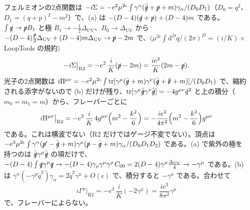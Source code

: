 \documentclass[a4paper,10pt]{ltjsarticle}
\newcommand{\dd}{\mathrm{d}}
\newcommand{\DUV}{\Delta_{\mathrm{UV}}}
\begin{document}
フェルミオンの2点関数は $-i\Sigma=-e^2\mu^{2\epsilon}\int\gamma^\alpha(\bar{\slashed q}+\slashed p+m)\gamma_\alpha/(D_0D_1)$（$D_0=q^2$、$D_1=(q+p)^2-m^2$）で、(a) は $-(D-4)(\slashed q+\slashed p)+(D-4)m$ である。$\int\slashed q\to\slashed pB_1$ と極 $B_1\to-\frac12\DUV$、$B_0\to\DUV$ から $-(D-4)\frac{\slashed p}{2}\DUV+(D-4)m\DUV\to\slashed p-2m$ で、$(\mu^{2\epsilon}\int\dd^Dq/(2\pi)^D=(i/K)\times$ LoopTools の規約$)$
\begin{equation*}
-i\Sigma\big|_{\mathrm{R2}}=-e^2\,\frac iK(\slashed p-2m)=\frac{ie^2}{K}(2m-\slashed p).
\end{equation*}
光子の2点関数は $i\Pi^{\mu\nu}=-e^2\mu^{2\epsilon}\int\mathrm{tr}[\gamma^\mu(\bar{\slashed q}+m)\gamma^\nu(\bar{\slashed q}+\slashed k+m)]/(D_0D_1)$ で、縮約される添字がないので (b) だけが残り、$\mathrm{tr}[\gamma^\mu\tilde{\slashed q}\gamma^\nu\tilde{\slashed q}]=-4g^{\mu\nu}\tilde q^2$ と上の積分（$m_0=m_1=m$）から、フレーバーごとに
\begin{equation*}
i\Pi^{\mu\nu}\big|_{\mathrm{R2}}=-e^2\,\frac iK\,4g^{\mu\nu}\Bigl(m^2-\frac{k^2}{6}\Bigr)=-\frac{ie^2}{4\pi^2}\Bigl(m^2-\frac{k^2}{6}\Bigr)g^{\mu\nu}
\end{equation*}
である。これは横波でない（R2 だけではゲージ不変でない）。頂点は $-e^3\mu^{2\epsilon}\int\gamma^\alpha(\slashed p'-\bar{\slashed q}+m)\gamma^\mu(\slashed p-\bar{\slashed q}+m)\gamma_\alpha/(D_0D_1D_2)$ である。(a) で紫外の極を持つのは $\bar{\slashed q}\gamma^\mu\bar{\slashed q}$ の項だけで、$-(D-4)\int\slashed q\gamma^\mu\slashed q\to-(D-4)\gamma_\rho\gamma^\mu\gamma^\rho\,C_{00}=2(D-4)\gamma^\mu\frac{\DUV}{4}\to-\gamma^\mu$ である。(b) は $\gamma^\alpha(-\gamma^\mu\tilde q^2)\gamma_\alpha=2\tilde q^2\gamma^\mu+O(\epsilon)$ で、積分すると $-\gamma^\mu$ である。合わせて
\begin{equation*}
i\Gamma^\mu\big|_{\mathrm{R2}}=-e^3\,\frac iK(-2\gamma^\mu)=\frac{ie^3}{8\pi^2}\gamma^\mu
\end{equation*}
で、フレーバーによらない。
\end{document}
